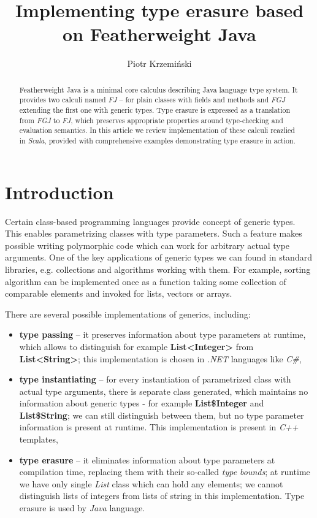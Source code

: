 \documentclass{article}[12pt]
\author{Piotr Krzemiński}
\title{Implementing type erasure based on Featherweight Java}
\date{}
\begin{document}
\maketitle


\begin{abstract}
Featherweight Java is a minimal core calculus describing Java language
type system. It provides two calculi named \emph{FJ} -- for plain classes with fields and methods and \emph{FGJ} extending the first
one with generic types. Type erasure is expressed as a translation
from \emph{FGJ} to \emph{FJ}, which preserves appropriate properties
around type-checking and evaluation semantics. In this article
we review implementation of these calculi reazlied in \emph{Scala}, provided with comprehensive examples demonstrating type erasure in action.
\end{abstract}


\section{Introduction}

Certain class-based programming languages provide concept of generic types. This enables parametrizing classes with type parameters. Such a feature makes possible writing polymorphic code which can work for arbitrary actual type arguments. One of the key applications of generic types we can found in standard libraries, e.g. collections and algorithms working with them. For example, sorting algorithm can be implemented once as a function taking some collection of comparable elements and invoked for lists, vectors or arrays.

There are several possible implementations of generics, including:

\begin{itemize}

\item{\textbf{type passing}} -- it preserves information about type parameters at runtime, which allows to distinguish for example \textbf{List<Integer>} from \textbf{List<String>}; this implementation is chosen in \emph{.NET} languages like \emph{C\#},

\item{\textbf{type instantiating}} -- for every instantiation of parametrized class with actual type arguments, there is separate class generated, which maintains no information about generic types - for example \textbf{List\$Integer} and \textbf{List\$String}; we can still distinguish between them,
but no type parameter information is present at runtime. This implementation is present in \emph{C++} templates,

\item{\textbf{type erasure}} -- it eliminates information about type parameters at compilation time, replacing them with their so-called \emph{type bounds}; at runtime we have only single \emph{List} class which can hold any elements; we cannot distinguish lists of integers from lists of string in this implementation. Type erasure is used by \emph{Java} language.

\end{itemize}
\end{document}
